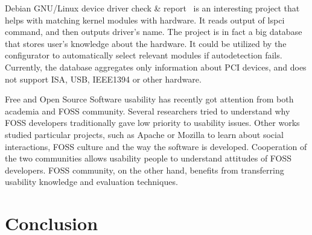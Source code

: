 \documentclass{chi2009}
\begin{document}
Debian GNU/Linux device driver check \& report~\cite{muto:check:2010} is an interesting project that helps with matching kernel modules with hardware. It reads output of \textsf{lspci} command, and then outputs driver's name. The project is in fact a big database that stores user's knowledge about the hardware. It could be utilized by the configurator to automatically select relevant modules if autodetection fails. Currently, the database aggregates only information about PCI devices, and does not support ISA, USB, IEEE1394 or other hardware.

Free and Open Source Software usability has recently got attention from both academia and FOSS community. Several researchers \cite{nichols:usability:2003,andreasen:usability:2006} tried to understand why FOSS developers traditionally gave low priority to usability issues. Other works studied particular projects, such as Apache \cite{mockus:apache:2000} or Mozilla \cite{mockus:mozilla:2002} to learn about social interactions, FOSS culture and the way the software is developed. Cooperation of the two communities allows usability people to understand attitudes of FOSS developers. FOSS community, on the other hand, benefits from transferring usability knowledge and evaluation techniques.

\section{Conclusion}\label{sec:conclusion}



\end{document}
